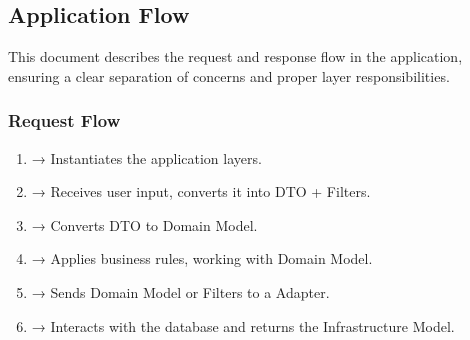 \documentclass[letterpaper,10pt,english]{sphinxhowto}
\begin{document}
\subsection{Application Flow}
\label{\detokenize{architecture/flow/index:application-flow}}\label{\detokenize{architecture/flow/index:id1}}\label{\detokenize{architecture/flow/index::doc}}
\sphinxAtStartPar
This document describes the request and response flow in the application, ensuring a clear separation of concerns and proper layer responsibilities.


\subsubsection{Request Flow}
\label{\detokenize{architecture/flow/index:request-flow}}\begin{enumerate}
%
\item {} 
\sphinxAtStartPar
{} → Instantiates the application layers.

\item {} 
\sphinxAtStartPar
{} → Receives user input, converts it into DTO + Filters.

\item {} 
\sphinxAtStartPar
{} → Converts DTO to Domain Model.

\item {} 
\sphinxAtStartPar
{} → Applies business rules, working with Domain Model.

\item {} 
\sphinxAtStartPar
{} → Sends Domain Model or Filters to a Adapter.

\item {} 
\sphinxAtStartPar
{} → Interacts with the database and returns the Infrastructure Model.

\end{enumerate}
\end{document}
